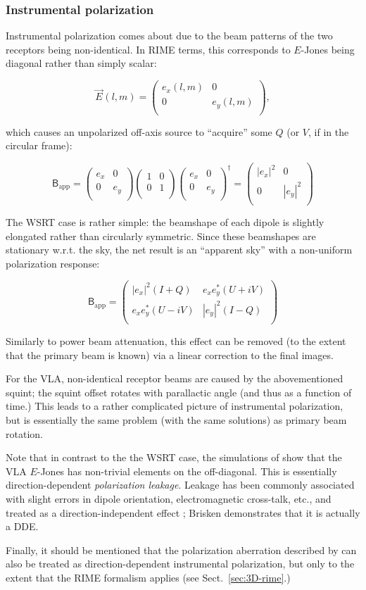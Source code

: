 \documentclass[]{aa}
\newcommand{\matrixtt}[4]{\left( \begin{array}{cc}#1&#2\\#3&#4\\\end{array} \right)}
\newcommand{\jones}[2]{\vec {#1}_{#2}}
\newcommand{\coh}[2]{\mathsf{{#1}}_{{#2}}}
\begin{document}
\subsubsection{Instrumental polarization}

Instrumental polarization comes about due to the beam patterns of the two receptors being non-identical. In RIME terms, this corresponds to $E$-Jones being diagonal rather than simply scalar:

\[
\jones{E}{}(l,m) = \matrixtt{e_x(l,m)}{0}{0}{e_y(l,m)},
\]

which causes an unpolarized off-axis source to ``acquire'' some $Q$ (or $V$, if in the circular frame):

\[
\coh{B}{\mathrm{app}} = \matrixtt{e_x}{0}{0}{e_y} 
\matrixtt{1}{0}{0}{1}
\matrixtt{e_x}{0}{0}{e_y}^\dagger =
\matrixtt{|e_x|^2}{0}{0}{|e_y|^2}
\]

The WSRT case is rather simple: the beamshape of each dipole is slightly elongated rather than circularly symmetric. Since these beamshapes are stationary w.r.t. the sky, the net result is an ``apparent sky'' with a non-uniform polarization response: 

\[
\coh{B}{\mathrm{app}} = \matrixtt{|e_x|^2(I+Q)}{e_x e^*_y(U+iV)}{e_x e^*_y(U-iV)}{|e_y|^2(I-Q)}
\]

Similarly to power beam attenuation, this effect can be removed (to the extent that the primary beam is known) via a linear correction to the final images.

For the VLA, non-identical receptor beams are caused by the abovementioned squint; the squint offset rotates with parallactic angle (and thus as a function of time.) This leads to a rather complicated picture of instrumental polarization, but is essentially the same problem (with the same solutions) as primary beam rotation.

Note that in contrast to the the WSRT case, the simulations of \citet{Brisken:VLA-beam} show that the VLA $E$-Jones has non-trivial elements on the off-diagonal. This is essentially direction-dependent {\em polarization leakage}. Leakage has been commonly associated with slight errors in dipole orientation, electromagnetic cross-talk, etc., and treated as a direction-independent effect \citep{ME1,JEN:note185}; Brisken demonstrates that it is actually a DDE.

Finally, it should be mentioned that the polarization aberration described by \citet{Carozzi:ME3D} can also be treated as direction-dependent instrumental polarization, but only to the extent that the RIME formalism applies (see Sect.~\ref{sec:3D-rime}.) 
\end{document}
